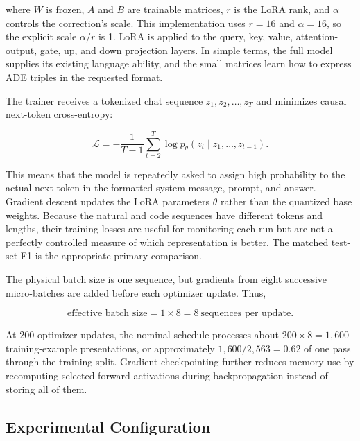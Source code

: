 \documentclass[11pt]{article}
\begin{document}
where $W$ is frozen, $A$ and $B$ are trainable matrices, $r$ is the LoRA
rank, and $\alpha$ controls the correction's scale. This implementation
uses $r=16$ and $\alpha=16$, so the explicit scale $\alpha/r$ is 1. LoRA
is applied to the query, key, value, attention-output, gate, up, and down
projection layers. In simple terms, the full model supplies its existing
language ability, and the small matrices learn how to express ADE
triples in the requested format.

The trainer receives a tokenized chat sequence
$z_1,z_2,\ldots,z_T$ and minimizes causal next-token cross-entropy:

\[
\mathcal{L}
= -\frac{1}{T-1}\sum_{t=2}^{T}
  \log p_{\theta}(z_t \mid z_1,\ldots,z_{t-1}).
\]

This means that the model is repeatedly asked to assign high probability
to the actual next token in the formatted system message, prompt, and
answer. Gradient descent updates the LoRA parameters $\theta$ rather than
the quantized base weights. Because the natural and code sequences have
different tokens and lengths, their training losses are useful for
monitoring each run but are not a perfectly controlled measure of which
representation is better. The matched test-set F1 is the appropriate
primary comparison.

The physical batch size is one sequence, but gradients from eight
successive micro-batches are added before each optimizer update. Thus,

\[
\text{effective batch size}
= 1 \times 8 = 8\ \text{sequences per update}.
\]

At 200 optimizer updates, the nominal schedule processes about
$200\times8=1{,}600$ training-example presentations, or approximately
$1{,}600/2{,}563=0.62$ of one pass through the training split. Gradient
checkpointing further reduces memory use by recomputing selected forward
activations during backpropagation instead of storing all of them.

\subsection{Experimental Configuration}
\label{implementation-experimental-configuration}
\end{document}
